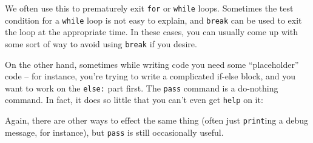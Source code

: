 \documentclass[m3380-lec-main.tex]{subfiles}
\begin{document}
\smallskip\noindent
We often use this to prematurely exit \verb|for| or \verb|while| loops. Sometimes the test condition for a \verb|while| loop is not easy to explain, and \verb|break| can be used to exit the loop at the appropriate time. In these cases, you can usually come up with some sort of way to avoid using \verb|break| if you desire. 

\smallskip\noindent

On the other hand, sometimes while writing code you need some ``placeholder'' code -- for instance, you're trying to write a complicated if-else block, and you want to work on the \verb|else:| part first. The \verb|pass| command is a do-nothing command. In fact, it does so little that you can't even get \verb|help| on it:

\smallskip\noindent

Again, there are other ways to effect the same thing (often just \verb|print|ing a debug message, for instance), but \verb|pass| is still occasionally useful.
\end{document}
